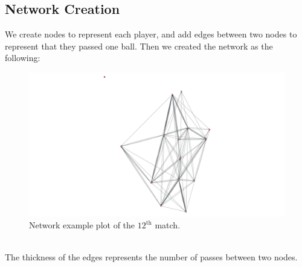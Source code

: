 \documentclass{mcmthesis}
\begin{document}
	\subsection{Network Creation}
			We create nodes to represent each player, and add edges between two nodes to represent that they passed one ball. Then we created the network as the following: 
			\begin{figure}[h!]
				\centering
				\includegraphics[scale=0.2]{images/network_12.png}
				\caption{Network example plot of the $12^\mathrm{th}$ match. }
			\end{figure} \\
			The thickness of the edges represents the number of passes between two nodes. 
\end{document}
